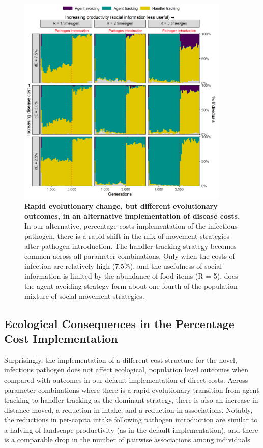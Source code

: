 \begin{figure}
    \centering
    \includegraphics[width=0.9\textwidth]{figures/pathomove/fig_evo_change_percent_cost.png}
    \caption{
        \textbf{Rapid evolutionary change, but different evolutionary outcomes, in an alternative implementation of disease costs.} In our alternative, percentage costs implementation of the infectious pathogen, there is a rapid shift in the mix of movement strategies after pathogen introduction. The handler tracking strategy becomes common across all parameter combinations. Only when the costs of infection are relatively high (7.5\%), and the usefulness of social information is limited by the abundance of food items (R = 5), does the agent avoiding strategy form about one fourth of the population mixture of social movement strategies.
    }
\end{figure}

\subsection*{Ecological Consequences in the Percentage Cost Implementation}

Surprisingly, the implementation of a different cost structure for the novel, infectious pathogen does not affect ecological, population level outcomes when compared with outcomes in our default implementation of direct costs.
Across parameter combinations where there is a rapid evolutionary transition from agent tracking to handler tracking as the dominant strategy, there is also an increase in distance moved, a reduction in intake, and a reduction in associations.
Notably, the reductions in per-capita intake following pathogen introduction are similar to a halving of landscape productivity (as in the default implementation), and there is a comparable drop in the number of pairwise associations among individuals.

